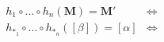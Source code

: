 \documentclass[]{article}
\newtheorem{thm}{Theorem}[subsection]
\newtheorem{Def}{Definition}[subsection]
\begin{document}
\begin{align*}
h_1 \circ ... \circ h_n(\mathbf{M})=\mathbf{M}'&\iff\\
h_{*_1} \circ ... \circ h_{*_n}([\beta])=[\alpha] &\iff
\end{align*}
%
%
%
%
\end{document}
